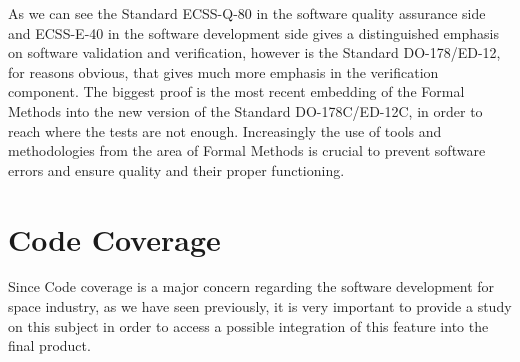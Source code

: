{As we can see the Standard ECSS-Q-80\cite{ecss-q-st-80c} in the software quality assurance side and ECSS-E-40\cite{ecss-e-st-40c} in the software development side
gives a distinguished emphasis on software validation and verification, however is the Standard DO-178/ED-12, for reasons obvious,
that gives much more emphasis in the verification component. The biggest proof is the most recent embedding of the Formal Methods into the
new version of the Standard DO-178C/ED-12C\cite{ed-12c}, in order to reach where the tests are not enough.
Increasingly the use of tools and methodologies from the area of Formal Methods is crucial to prevent software errors and ensure quality and their proper functioning.

\section{Code Coverage}\label{sec:ccoverage}
Since Code coverage is a major concern regarding the software development for space industry, as we have seen previously, it is very important to provide a study on this subject
in order to access a possible integration of this feature into the final product.

}
